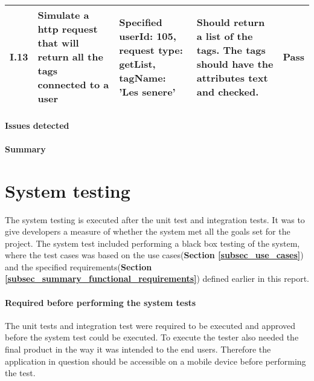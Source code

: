 {{\begin{longtable}{ | p{1cm} | p{6.5cm} | p{3cm} | p{6.5cm} |}
					
			I.13 & Simulate a http request that will return all the tags connected to a user  & Specified userId: 105, \newline request type: getList, \newline tagName: 'Les senere' & Should return a list of the tags. The tags should have the attributes text and checked. & Pass\\ \hline	

\end{longtable}

\paragraph{Issues detected}

\paragraph{Summary}


\section{System testing}

The system testing is executed after the unit test and integration tests. It was to give developers a measure of whether the system met all the goals set for the project.  The system test included performing a black box testing of the system, where the test cases was based on the use cases(\textbf{Section \ref{subsec_use_cases}}) and the specified requirements(\textbf{Section \ref{subsec_summary_functional_requirements}})  defined earlier in this report. \newline

\paragraph{Required before performing the system tests}
The unit tests and integration test were required to be executed and approved before the system test could be executed. To execute the tester also needed the final product in the way it was intended to the end users. Therefore the application in question should be accessible on a mobile device before performing the test. \newline

}}
